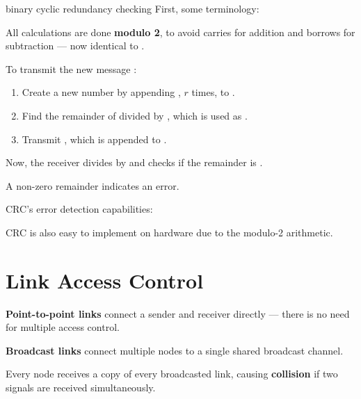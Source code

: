 \begin{defn}{binary cyclic redundancy checking}
    First, some terminology:
    \begin{itemize}
    \end{itemize}

    All calculations are done \textbf{modulo 2}, to avoid carries for addition and borrows for subtraction
    --- now identical to .

    To transmit the new message :
    \begin{enumerate}
        \item Create a new number  by appending , $r$ times, to .
        \item Find the remainder of  divided by , which is used as .
        \item Transmit , which is  appended to .
    \end{enumerate}

    Now, the receiver divides  by  and checks if the remainder is .

    A non-zero remainder indicates an error.
\end{defn}

CRC's error detection capabilities:
\begin{itemize}
\end{itemize}

CRC is also easy to implement on hardware due to the modulo-2 arithmetic.


\section{Link Access Control}
\textbf{Point-to-point links} connect a sender and receiver directly ---
there is no need for multiple access control.

\textbf{Broadcast links} connect multiple nodes to a single shared broadcast channel.

Every node receives a copy of every broadcasted link, causing \textbf{collision}
if two signals are received simultaneously.

